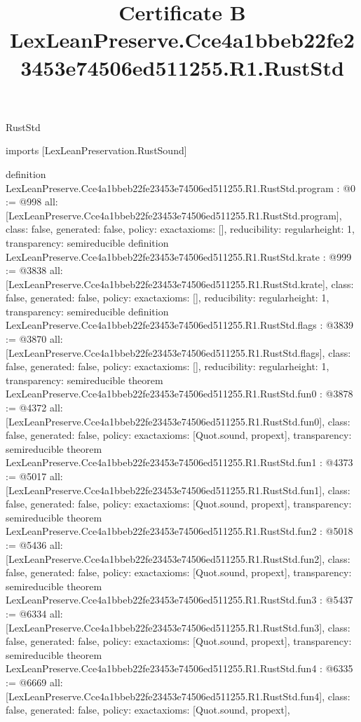 \begin{lexlean}{RustStd}
\title{Certificate B LexLeanPreserve.Cce4a1bbeb22fe23453e74506ed511255.R1.RustStd}
\begin{coremodule}
imports [LexLeanPreservation.RustSound]

definition LexLeanPreserve.Cce4a1bbeb22fe23453e74506ed511255.R1.RustStd.program : @0 := @998 {
  all: [LexLeanPreserve.Cce4a1bbeb22fe23453e74506ed511255.R1.RustStd.program],
  class: false,
  generated: false,
  policy: exact{axioms: []},
  reducibility: regular{height: 1},
  transparency: semireducible
}
definition LexLeanPreserve.Cce4a1bbeb22fe23453e74506ed511255.R1.RustStd.krate : @999 := @3838 {
  all: [LexLeanPreserve.Cce4a1bbeb22fe23453e74506ed511255.R1.RustStd.krate],
  class: false,
  generated: false,
  policy: exact{axioms: []},
  reducibility: regular{height: 1},
  transparency: semireducible
}
definition LexLeanPreserve.Cce4a1bbeb22fe23453e74506ed511255.R1.RustStd.flags : @3839 := @3870 {
  all: [LexLeanPreserve.Cce4a1bbeb22fe23453e74506ed511255.R1.RustStd.flags],
  class: false,
  generated: false,
  policy: exact{axioms: []},
  reducibility: regular{height: 1},
  transparency: semireducible
}
theorem LexLeanPreserve.Cce4a1bbeb22fe23453e74506ed511255.R1.RustStd.fun0 : @3878 := @4372 {
  all: [LexLeanPreserve.Cce4a1bbeb22fe23453e74506ed511255.R1.RustStd.fun0],
  class: false,
  generated: false,
  policy: exact{axioms: [Quot.sound, propext]},
  transparency: semireducible
}
theorem LexLeanPreserve.Cce4a1bbeb22fe23453e74506ed511255.R1.RustStd.fun1 : @4373 := @5017 {
  all: [LexLeanPreserve.Cce4a1bbeb22fe23453e74506ed511255.R1.RustStd.fun1],
  class: false,
  generated: false,
  policy: exact{axioms: [Quot.sound, propext]},
  transparency: semireducible
}
theorem LexLeanPreserve.Cce4a1bbeb22fe23453e74506ed511255.R1.RustStd.fun2 : @5018 := @5436 {
  all: [LexLeanPreserve.Cce4a1bbeb22fe23453e74506ed511255.R1.RustStd.fun2],
  class: false,
  generated: false,
  policy: exact{axioms: [Quot.sound, propext]},
  transparency: semireducible
}
theorem LexLeanPreserve.Cce4a1bbeb22fe23453e74506ed511255.R1.RustStd.fun3 : @5437 := @6334 {
  all: [LexLeanPreserve.Cce4a1bbeb22fe23453e74506ed511255.R1.RustStd.fun3],
  class: false,
  generated: false,
  policy: exact{axioms: [Quot.sound, propext]},
  transparency: semireducible
}
theorem LexLeanPreserve.Cce4a1bbeb22fe23453e74506ed511255.R1.RustStd.fun4 : @6335 := @6669 {
  all: [LexLeanPreserve.Cce4a1bbeb22fe23453e74506ed511255.R1.RustStd.fun4],
  class: false,
  generated: false,
  policy: exact{axioms: [Quot.sound, propext]},
}
\end{coremodule}
\end{lexlean}
